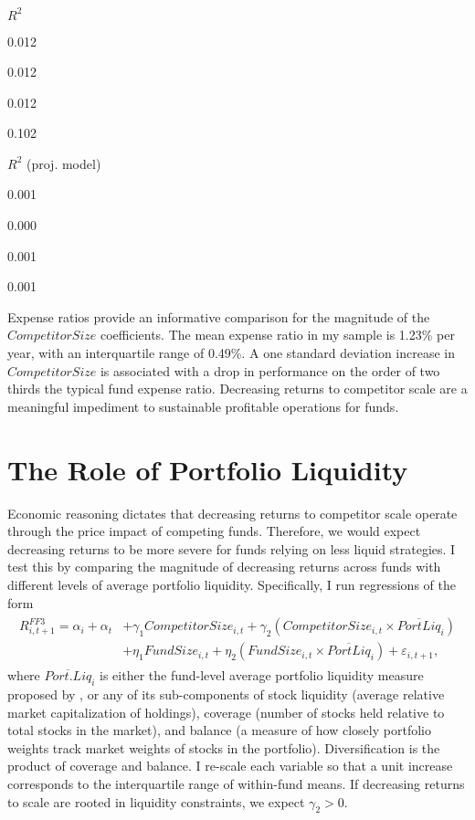 \documentclass[]{book}
\theoremstyle{definition}
\theoremstyle{definition}
\theoremstyle{definition}
\theoremstyle{remark}
\begin{document}
\(R^2\)

0.012

0.012

0.012

0.102

\(R^2\) (proj. model)

0.001

0.000

0.001

0.001

Expense ratios provide an informative comparison for the magnitude of
the \(CompetitorSize\) coefficients. The mean expense ratio in my sample
is 1.23\% per year, with an interquartile range of 0.49\%. A one
standard deviation increase in \(CompetitorSize\) is associated with a
drop in performance on the order of two thirds the typical fund expense
ratio. Decreasing returns to competitor scale are a meaningful
impediment to sustainable profitable operations for funds.

\hypertarget{sec:heterogeneity}{%
\section{The Role of Portfolio Liquidity}\label{sec:heterogeneity}}

Economic reasoning dictates that decreasing returns to competitor scale
operate through the price impact of competing funds. Therefore, we would
expect decreasing returns to be more severe for funds relying on less
liquid strategies. I test this by comparing the magnitude of decreasing
returns across funds with different levels of average portfolio
liquidity. Specifically, I run regressions of the form \begin{align}
\begin{split}
R^{FF3}_{i,t+1} = \alpha_i + \alpha_t &+ \gamma_1 CompetitorSize_{i,t} + \gamma_2 \left( CompetitorSize_{i,t} \times \overline{PortLiq}_{i} \right) \\ 
&+ \eta_1 FundSize_{i,t} + \eta_2 \left( FundSize_{i,t} \times \overline{PortLiq}_i \right) + \varepsilon_{i,t+1},
\end{split}
\label{eq:AvgLiqReg}
\end{align} where \(\overline{Port.Liq}_i\) is either the fund-level
average portfolio liquidity measure proposed by \citet{pst17L}, or any
of its sub-components of stock liquidity (average relative market
capitalization of holdings), coverage (number of stocks held relative to
total stocks in the market), and balance (a measure of how closely
portfolio weights track market weights of stocks in the portfolio).
Diversification is the product of coverage and balance. I re-scale each
variable so that a unit increase corresponds to the interquartile range
of within-fund means. If decreasing returns to scale are rooted in
liquidity constraints, we expect \(\gamma_2>0\).
\end{document}
